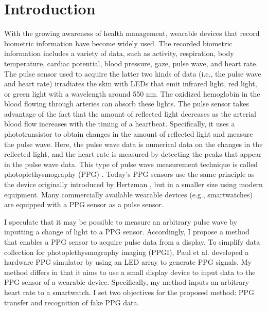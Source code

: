 \chapter{Introduction}
\label{sec:introduction}
With the growing awareness of health management, wearable devices that record biometric information have become widely used. The recorded biometric information includes a variety of data, such as activity, respiration, body temperature, cardiac potential, blood pressure, gaze, pulse wave, and heart rate. The pulse sensor used to acquire the latter two kinds of data (i.e., the pulse wave and heart rate) irradiates the skin with LEDs that emit infrared light, red light, or green light with a wavelength around 550 nm. The oxidized hemoglobin in the blood flowing through arteries can absorb these lights. The pulse sensor takes advantage of the fact that the amount of reflected light decreases as the arterial blood flow increases with the timing of a heartbeat. Specifically, it uses a phototransistor to obtain changes in the amount of reflected light and measure the pulse wave. Here, the pulse wave data is numerical data on the changes in the reflected light, and the heart rate is measured by detecting the peaks that appear in the pulse wave data. This type of pulse wave measurement technique is called photoplethysmography (PPG) \cite{ppg}. Today's PPG sensors use the same principle as the device originally introduced by Hertzman \cite{ppg_principle1, ppg_principle2}, but in a smaller size using modern equipment. Many commercially available wearable devices (e.g., smartwatches) are equipped with a PPG sensor as a pulse sensor.\par

I speculate that it may be possible to measure an arbitrary pulse wave by inputting a change of light to a PPG sensor. Accordingly, I propose a method that enables a PPG sensor to acquire pulse data from a display. To simplify data collection for photoplethysmography imaging (PPGI), Paul et al. \cite{ppg_generator} developed a hardware PPG simulator by using an LED array to generate PPG signals. My method differs in that it aims to use a small display device to input data to the PPG sensor of a wearable device. Specifically, my method inputs an arbitrary heart rate to a smartwatch. I set two objectives for the proposed method: PPG transfer and recognition of fake PPG data.\par

